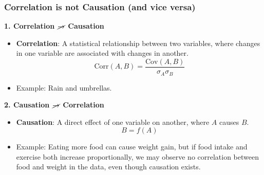 \documentclass[xcolor=svgnames,t]{beamer}
\begin{document}
\begin{frame}
    \frametitle{Correlation is not Causation (and vice versa)}

    \textbf{1. Correlation \(\cancel{\rightarrow}\) Causation}
    
    \pause %
    
    \begin{itemize}
        \item \textbf{Correlation}: A statistical relationship between two variables, where changes in one variable are associated with changes in another. 
        \[
        \text{Corr}(A, B) = \frac{\text{Cov}(A, B)}{\sigma_A \sigma_B}
        \]
    \end{itemize}
    
    \pause %
    
    \begin{itemize}
        \item Example: Rain and umbrellas. 
    \end{itemize}

    \pause %

    \textbf{2. Causation \(\cancel{\rightarrow}\) Correlation}

    \pause %
    
    \begin{itemize}
        \item \textbf{Causation}: A direct effect of one variable on another, where \(A\) causes \(B\).
        \[
        B = f(A)
        \]
    \end{itemize}
    
    \pause %
    
    \begin{itemize}
        \item Example: Eating more food can cause weight gain, but if food intake and exercise both increase proportionally, we may observe no correlation between food and weight in the data, even though causation exists.
    \end{itemize}

\end{frame}
\end{document}
